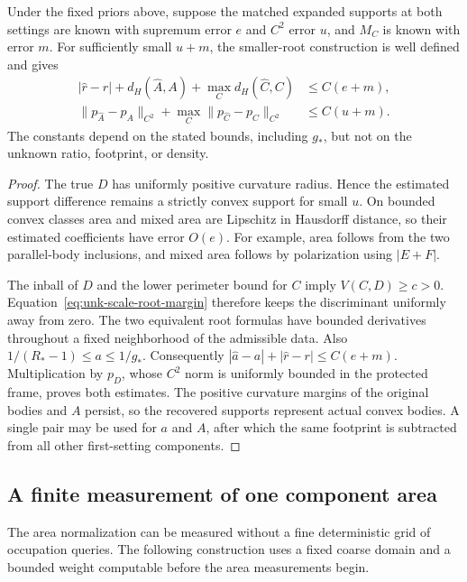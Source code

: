 \begin{proposition}
\label{prop:unk-scale-stability}
Under the fixed priors above, suppose the matched expanded supports
at both settings are known with supremum error $e$ and $C^2$ error $u$, and
$M_C$ is known with error $m$. For sufficiently small $u+m$, the
smaller-root construction is well defined and gives
\begin{align}
 |\widehat r-r|+d_H(\widehat A,A)
                 +\max_Cd_H(\widehat C,C)&\le C(e+m),
                                      \label{eq:unk-scale-stability-0}\\
 \|p_{\widehat A}-p_A\|_{C^2}
       +\max_C\|p_{\widehat C}-p_C\|_{C^2}&\le C(u+m).
                                      \label{eq:unk-scale-stability-2}
\end{align}
The constants depend on the stated bounds, including $g_*$, but not
on the unknown ratio, footprint, or density.
\end{proposition}
\begin{proof}
The true $D$ has uniformly positive curvature radius. Hence the
estimated support difference remains a strictly convex support for
small $u$. On bounded convex classes area and mixed area are Lipschitz
in Hausdorff distance, so their estimated coefficients have error
$O(e)$. For example, area follows from the two parallel-body
inclusions, and mixed area follows by polarization using $|E+F|$.

The inball of $D$ and the lower perimeter bound for $C$ imply
$V(C,D)\ge c>0$. Equation~\eqref{eq:unk-scale-root-margin} therefore
keeps the discriminant uniformly away from zero. The two equivalent
root formulas have bounded derivatives throughout a fixed
neighborhood of the admissible data. Also
$1/(R_*-1)\le a\le1/g_*$. Consequently
$|\widehat a-a|+|\widehat r-r|\le C(e+m)$.
Multiplication by $p_D$, whose $C^2$ norm is uniformly bounded in the
protected frame, proves both estimates. The positive curvature
margins of the original bodies and $A$ persist, so the recovered
supports represent actual convex bodies. A single pair may be used
for $a$ and $A$, after which the same footprint is subtracted from all
other first-setting components.
\end{proof}

\subsection{A finite measurement of one component area}
The area normalization can be measured without a fine deterministic
grid of occupation queries. The following construction uses a fixed
coarse domain and a bounded weight computable before the area
measurements begin.

